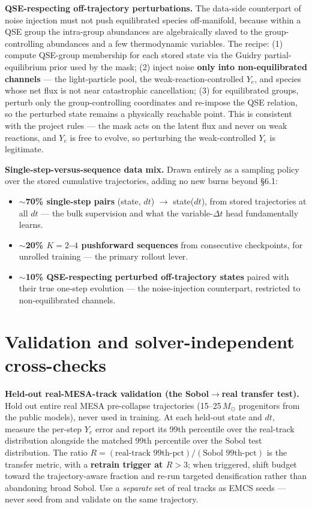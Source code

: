 \documentclass[11pt]{article}
\begin{document}
\textbf{QSE-respecting off-trajectory perturbations.} The data-side counterpart of noise injection must not push equilibrated species off-manifold, because within a QSE group the intra-group abundances are algebraically slaved to the group-controlling abundances and a few thermodynamic variables. The recipe: (1) compute QSE-group membership for each stored state via the Guidry partial-equilibrium prior used by the mask; (2) inject noise \textbf{only into non-equilibrated channels} --- the light-particle pool, the weak-reaction-controlled $Y_e$, and species whose net flux is not near catastrophic cancellation; (3) for equilibrated groups, perturb only the group-controlling coordinates and re-impose the QSE relation, so the perturbed state remains a physically reachable point. This is consistent with the project rules --- the mask acts on the latent flux and never on weak reactions, and $Y_e$ is free to evolve, so perturbing the weak-controlled $Y_e$ is legitimate.

\textbf{Single-step-versus-sequence data mix.} Drawn entirely as a sampling policy over the stored cumulative trajectories, adding no new burns beyond \S6.1:

\begin{itemize}
\item \textbf{$\sim$70\% single-step pairs} (state, $dt$) $\to$ state($dt$), from stored trajectories at all $dt$ --- the bulk supervision and what the variable-$\Delta t$ head fundamentally learns.
\item \textbf{$\sim$20\% $K = 2$--$4$ pushforward sequences} from consecutive checkpoints, for unrolled training --- the primary rollout lever.
\item \textbf{$\sim$10\% QSE-respecting perturbed off-trajectory states} paired with their true one-step evolution --- the noise-injection counterpart, restricted to non-equilibrated channels.
\end{itemize}

\section{Validation and solver-independent cross-checks}

\textbf{Held-out real-MESA-track validation (the Sobol$\to$real transfer test).} Hold out entire real MESA pre-collapse trajectories (15--25\,$M_\odot$ progenitors from the public models), never used in training. At each held-out state and $dt$, measure the per-step $Y_e$ error and report its 99th percentile over the real-track distribution alongside the matched 99th percentile over the Sobol test distribution. The ratio \textbf{$R = (\text{real-track 99th-pct}) / (\text{Sobol 99th-pct})$} is the transfer metric, with a \textbf{retrain trigger at $R > 3$}; when triggered, shift budget toward the trajectory-aware fraction and re-run targeted densification rather than abandoning broad Sobol. Use a \emph{separate} set of real tracks as EMCS seeds --- never seed from and validate on the same trajectory.
\end{document}
